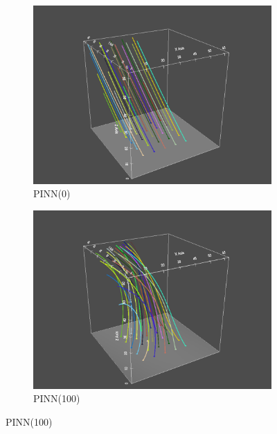 \begin{figure}
  \begin{subfigure}{.5\linewidth}
    \centering
    \caption{PINN(0)}\label{fig:pv0}
    \includegraphics[trim={6cm 0cm 6cm 3cm}, clip, width=\linewidth]{"img/PINN_000000_xz_tilted.pdf"}
  \end{subfigure}%
  \begin{subfigure}{.5\linewidth}
    \centering
    \caption{PINN(100)}
    \includegraphics[trim={6cm 0cm 6cm 3cm}, clip, width=\linewidth]{"img/PINN_000100_xz_tilted.pdf"}
  \end{subfigure}


\end{figure}
